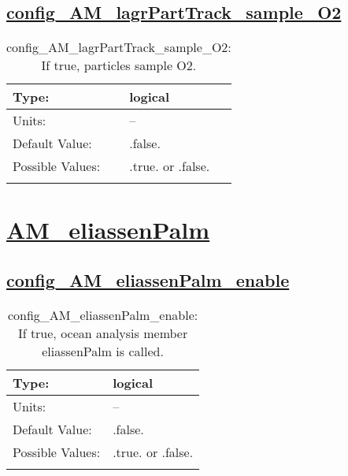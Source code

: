 \subsection[config\_AM\_lagrPartTrack\_sample\_O2]{\hyperref[sec:nm_tab_AM_lagrPartTrack]{config\_AM\_lagrPartTrack\_sample\_O2}}
\label{subsec:nm_sec_config_AM_lagrPartTrack_sample_O2}
\begin{center}
\begin{longtable}{| p{2.0in} || p{4.0in} |}
    \hline
    Type: & logical \\
    \hline
    Units: & -- \\
    \hline
    Default Value: & .false. \\
    \hline
    Possible Values: & .true. or .false. \\
    \hline
    \caption{config\_AM\_lagrPartTrack\_sample\_O2: If true, particles sample O2.}
\end{longtable}
\end{center}
\section[AM\_eliassenPalm]{\hyperref[sec:nm_tab_AM_eliassenPalm]{AM\_eliassenPalm}}
\label{sec:nm_sec_AM_eliassenPalm}
\subsection[config\_AM\_eliassenPalm\_enable]{\hyperref[sec:nm_tab_AM_eliassenPalm]{config\_AM\_eliassenPalm\_enable}}
\label{subsec:nm_sec_config_AM_eliassenPalm_enable}
\begin{center}
\begin{longtable}{| p{2.0in} || p{4.0in} |}
    \hline
    Type: & logical \\
    \hline
    Units: & -- \\
    \hline
    Default Value: & .false. \\
    \hline
    Possible Values: & .true. or .false. \\
    \hline
    \caption{config\_AM\_eliassenPalm\_enable: If true, ocean analysis member eliassenPalm is called.}
\end{longtable}
\end{center}
